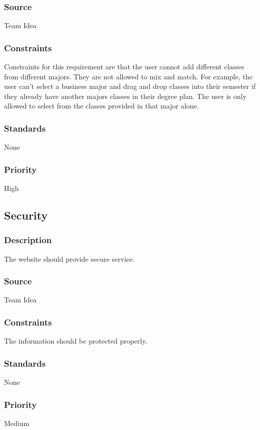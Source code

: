 \subsubsection{Source}
Team Idea
\subsubsection{Constraints}
Constraints for this requirement are that the user cannot add different classes from different majors. They are not allowed to mix and match. For example, the user can't select a business major and drag and drop classes into their semester if they already have another majors classes in their degree plan. The user is only allowed to select from the classes provided in that major alone.  
\subsubsection{Standards}
None
\subsubsection{Priority}
High

\subsection{Security}
\subsubsection{Description}
The website should provide secure service.
\subsubsection{Source}
Team Idea
\subsubsection{Constraints}
The information should be protected properly.
\subsubsection{Standards}
None
\subsubsection{Priority}
Medium


